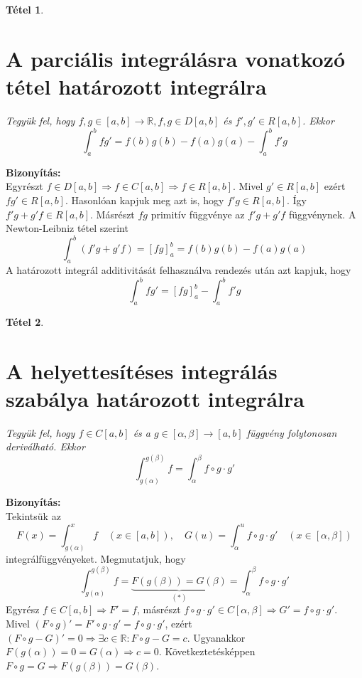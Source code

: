 \documentclass{article}
\newtheorem{theorem}{Tétel}
\renewenvironment{proof}{\textbf{Bizonyítás:} \\}{\hfill}
\begin{document}
\newpage
\begin{theorem}
\section{A parciális integrálásra vonatkozó tétel határozott integrálra} 
Tegyük fel, hogy $f,g \in [a,b] \to \mathbb{R}, f,g\in D[a,b]$ és $f',g'\in R[a,b]$. Ekkor
\begin{equation*}
    \int_a^bfg'=f(b)g(b)-f(a)g(a)-\int_a^bf'g
\end{equation*}
\end{theorem}
\begin{proof}
Egyrészt $f\in D[a,b]\Longrightarrow f\in C[a,b]\Longrightarrow f\in R[a,b]$. Mivel $g' \in R[a,b]$ ezért $fg' \in R[a,b]$. Hasonlóan kapjuk meg azt is, hogy $f'g\in R[a,b]$. Így $f'g+g'f\in R[a,b]$. Másrészt $fg$ primitív függvénye az $f'g+g'f$ függvénynek. A Newton-Leibniz tétel szerint
\begin{equation*}
    \int_a^b(f'g+g'f)=[fg]_a^b=f(b)g(b)-f(a)g(a)
\end{equation*}
A határozott integrál additivitását felhasználva rendezés után azt kapjuk, hogy
\begin{equation*}
    \int_a^bfg'=[fg]_a^b-\int_a^bf'g
\end{equation*}
\end{proof}
\newpage
\begin{theorem}
\section{A helyettesítéses integrálás szabálya határozott integrálra} 
Tegyük fel, hogy $f\in C[a,b]$ és a $g\in[\alpha,\beta]\to[a,b]$ függvény folytonosan deriválható. Ekkor
\begin{equation*}
    \int_{g(\alpha)}^{g(\beta)}f=\int_{\alpha}^{\beta}f\circ g\cdot g'
\end{equation*}
\end{theorem}
\begin{proof}
Tekintsük az
\begin{equation*}
    F(x)=\int_{g(\alpha)}^xf\quad(x\in[a,b]),\quad G(u)=\int_\alpha^uf\circ g\cdot g'\quad(x\in[\alpha,\beta])
\end{equation*}
integrálfüggvényeket. Megmutatjuk, hogy
\begin{equation*}
    \int_{g(\alpha)}^{g(\beta)}f=\underbrace{F(g(\beta))=G(\beta)}_{(*)}=\int_\alpha^\beta f\circ g\cdot g'
\end{equation*}
Egyrész $f\in C[a,b]\Longrightarrow F' = f$, másrészt $f\circ g \cdot g'\in C[\alpha,\beta]\Longrightarrow G'= f\circ g\cdot g'$. Mivel $(F\circ g)'=F'\circ g\cdot g'=f \circ g \cdot g'$, ezért $(F \circ g - G)'= 0\Longrightarrow \exists c \in \mathbb{R}: F \circ g - G = c$. Ugyanakkor $F(g(\alpha))=0=G(\alpha)\Longrightarrow c=0$. Következtetésképpen $F\circ g=G\Longrightarrow F(g(\beta))=G(\beta)$.
\end{proof}
\end{document}
